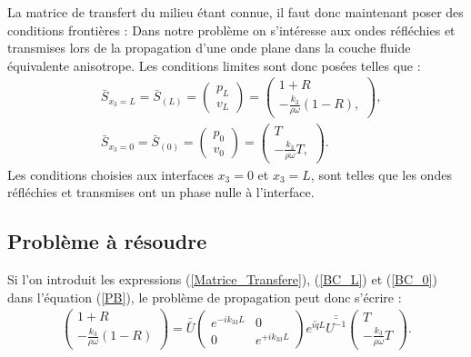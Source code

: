\documentclass[twoside,openright]{report}
\begin{document}
    La matrice de transfert du milieu étant connue, il faut donc maintenant poser des conditions frontières : Dans notre problème on s'intéresse aux ondes réfléchies et transmises lors de la propagation d'une onde plane dans la couche fluide équivalente anisotrope. Les conditions limites sont donc posées telles que :
    \begin{align}
    &\bar{S}_{x_3=L}=\bar{S}_{(L)}=\begin{pmatrix}
    						p_L \\ v_L
    					\end{pmatrix} = \begin{pmatrix}
    										1+R \\ -\frac{\displaystyle{k_3}}{\displaystyle{\rho \omega}}(1-R),
    									\end{pmatrix},\label{BC_L} \\
  	&\bar{S}_{x_3=0}=\bar{S}_{(0)}=\begin{pmatrix}
    						p_0 \\ v_0
    					\end{pmatrix} =\begin{pmatrix}
    						T \\ -\frac{\displaystyle{k_3}}{\displaystyle{\rho \omega}}T,
    					\end{pmatrix}.\label{BC_0}
    \end{align}    
     Les conditions choisies aux interfaces $x_3=0$ et $x_3=L$, sont telles que les ondes réfléchies et transmises ont un phase nulle à l'interface.
        
\subsection{Problème à résoudre}    
    Si l'on introduit les expressions (\ref{Matrice_Transfere}), (\ref{BC_L}) et (\ref{BC_0}) dans l'équation (\ref{PB}), le problème de propagation peut donc s'écrire :
    \begin{align}
        \begin{pmatrix}
    	    1+R \\ -\frac{\displaystyle{k_3}}{\displaystyle{\rho \omega}}(1-R)
    	\end{pmatrix}=\bar{\bar{U}}\begin{pmatrix}
                        e^{-ik_{33}L} & 0 \\ 0 & e^{+ik_{33}L} 
                      \end{pmatrix} e^{i\tilde{q}L}\bar{\bar{U^{-1}}}\begin{pmatrix}
    					                            	T \\ -\frac{\displaystyle{k_3}}{\displaystyle{\rho \omega}}T
    				                                        	\end{pmatrix}.\label{Eq_Prop}
    \end{align}
\end{document}
